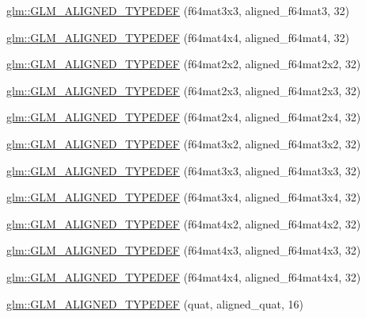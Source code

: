 \begin{DoxyCompactItemize}
\item 
\hyperlink{group__gtx__type__aligned_gaae8e4639c991e64754145ab8e4c32083}{glm\-::\-G\-L\-M\-\_\-\-A\-L\-I\-G\-N\-E\-D\-\_\-\-T\-Y\-P\-E\-D\-E\-F} (f64mat3x3, aligned\-\_\-f64mat3, 32)
\item 
\hyperlink{group__gtx__type__aligned_ga6e9094f3feb3b5b49d0f83683a101fde}{glm\-::\-G\-L\-M\-\_\-\-A\-L\-I\-G\-N\-E\-D\-\_\-\-T\-Y\-P\-E\-D\-E\-F} (f64mat4x4, aligned\-\_\-f64mat4, 32)
\item 
\hyperlink{group__gtx__type__aligned_gadbd2c639c03de1c3e9591b5a39f65559}{glm\-::\-G\-L\-M\-\_\-\-A\-L\-I\-G\-N\-E\-D\-\_\-\-T\-Y\-P\-E\-D\-E\-F} (f64mat2x2, aligned\-\_\-f64mat2x2, 32)
\item 
\hyperlink{group__gtx__type__aligned_gab059d7b9fe2094acc563b7223987499f}{glm\-::\-G\-L\-M\-\_\-\-A\-L\-I\-G\-N\-E\-D\-\_\-\-T\-Y\-P\-E\-D\-E\-F} (f64mat2x3, aligned\-\_\-f64mat2x3, 32)
\item 
\hyperlink{group__gtx__type__aligned_gabbc811d1c52ed2b8cfcaff1378f75c69}{glm\-::\-G\-L\-M\-\_\-\-A\-L\-I\-G\-N\-E\-D\-\_\-\-T\-Y\-P\-E\-D\-E\-F} (f64mat2x4, aligned\-\_\-f64mat2x4, 32)
\item 
\hyperlink{group__gtx__type__aligned_ga9ddf5212777734d2fd841a84439f3bdf}{glm\-::\-G\-L\-M\-\_\-\-A\-L\-I\-G\-N\-E\-D\-\_\-\-T\-Y\-P\-E\-D\-E\-F} (f64mat3x2, aligned\-\_\-f64mat3x2, 32)
\item 
\hyperlink{group__gtx__type__aligned_gad1dda32ed09f94bfcf0a7d8edfb6cf13}{glm\-::\-G\-L\-M\-\_\-\-A\-L\-I\-G\-N\-E\-D\-\_\-\-T\-Y\-P\-E\-D\-E\-F} (f64mat3x3, aligned\-\_\-f64mat3x3, 32)
\item 
\hyperlink{group__gtx__type__aligned_ga5875e0fa72f07e271e7931811cbbf31a}{glm\-::\-G\-L\-M\-\_\-\-A\-L\-I\-G\-N\-E\-D\-\_\-\-T\-Y\-P\-E\-D\-E\-F} (f64mat3x4, aligned\-\_\-f64mat3x4, 32)
\item 
\hyperlink{group__gtx__type__aligned_ga41e82cd6ac07f912ba2a2d45799dcf0d}{glm\-::\-G\-L\-M\-\_\-\-A\-L\-I\-G\-N\-E\-D\-\_\-\-T\-Y\-P\-E\-D\-E\-F} (f64mat4x2, aligned\-\_\-f64mat4x2, 32)
\item 
\hyperlink{group__gtx__type__aligned_ga0892638d6ba773043b3d63d1d092622e}{glm\-::\-G\-L\-M\-\_\-\-A\-L\-I\-G\-N\-E\-D\-\_\-\-T\-Y\-P\-E\-D\-E\-F} (f64mat4x3, aligned\-\_\-f64mat4x3, 32)
\item 
\hyperlink{group__gtx__type__aligned_ga912a16432608b822f1e13607529934c1}{glm\-::\-G\-L\-M\-\_\-\-A\-L\-I\-G\-N\-E\-D\-\_\-\-T\-Y\-P\-E\-D\-E\-F} (f64mat4x4, aligned\-\_\-f64mat4x4, 32)
\item 
\hyperlink{group__gtx__type__aligned_gafd945a8ea86b042aba410e0560df9a3d}{glm\-::\-G\-L\-M\-\_\-\-A\-L\-I\-G\-N\-E\-D\-\_\-\-T\-Y\-P\-E\-D\-E\-F} (quat, aligned\-\_\-quat, 16)

\end{DoxyCompactItemize}
